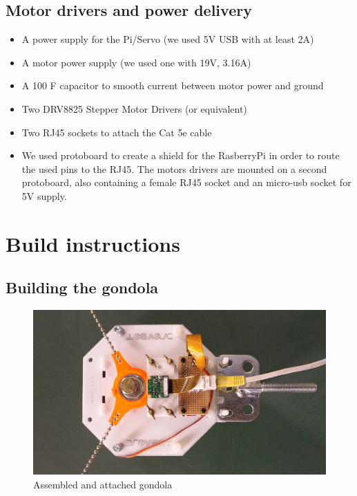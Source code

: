 \documentclass[a4paper,10pt]{article}
\begin{document}
\subsection*{Motor drivers and power delivery}
\begin{itemize}
  \item A power supply for the Pi/Servo (we used 5V USB with at least 2A)
  \item A motor power supply (we used one with 19V, 3.16A)
  \item A 100 \textmu F capacitor to smooth current between motor power and ground
  \item Two DRV8825 Stepper Motor Drivers (or equivalent)
  \item Two RJ45 sockets to attach the Cat 5e cable
  \item We used protoboard to create a shield for the RasberryPi in order to route the used pins to the RJ45. The motors drivers are mounted on a second protoboard, also containing a female RJ45 socket and an micro-usb socket for 5V supply.
\end{itemize}

\clearpage
\section{Build instructions}
\label{sec:buildinst}

\subsection{Building the gondola}

\begin{figure}[h!]
  \centering
  \includegraphics{img/gondola.jpg}
  \caption{Assembled and attached gondola}
  \label{fig:gondola}
\end{figure}
\end{document}
